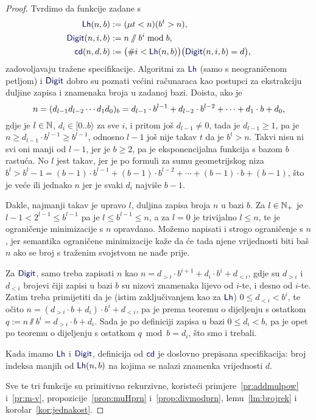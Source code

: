 \begin{proof}
Tvrdimo da funkcije zadane s
\begin{align}
    \f{Lh}(n,b)&:=(\mu t< n)(b^t>n)\text,\\
    \f{Digit}(n,i,b)&:=n\sslash b^i\bmod b\text,\\
    \f{cd}(n,d,b)&:=\bigl(\#i<\f{Lh}(n,b)\bigr)\bigl(\f{Digit}(n,i,b)=d\bigr)\text,
\end{align}
zadovoljavaju tražene specifikacije. Algoritmi za $\f{Lh}$ (samo s neograničenom petljom) i $\f{Digit}$ dobro su poznati većini računaraca kao postupci za ekstrakciju duljine zapisa i znamenaka broja u zadanoj bazi. Doista, ako je 
\begin{equation}
n=(d_{l-1}d_{l-2}\dotsm d_1d_0)_b=d_{l-1}\cdot b^{l-1}+d_{l-2}\cdot b^{l-2}+\dotsb+d_1\cdot b+d_0\text,
\end{equation}
gdje je $l\in{\mathbb N}$, $d_i\in[0..b\rangle$ za sve $i$, i pritom još $d_{l-1}\not=0$, tada je $d_{l-1}\ge1$, pa je $n\ge d_{l-1}\cdot b^{l-1}\ge b^{l-1}$, odnosno $l-1$ još nije takav $t$ da je $b^t>n$. Takvi nisu ni svi oni manji od $l-1$, jer je $b\ge 2$, pa je eksponencijalna funkcija s bazom $b$ rastuća. No $l$ jest takav, jer je po formuli za sumu geometrijskog niza $b^l>b^l-1=(b-1)\cdot b^{l-1}+(b-1)\cdot b^{l-2}+\dotsb+(b-1)\cdot b+(b-1)$, što je veće ili jednako $n$ jer je svaki $d_i$ najviše $b-1$.

Dakle, najmanji takav je upravo $l$, duljina zapisa broja $n$ u bazi $b$. Za $l\in{\mathbb N}_+$ je $l-1<2^{l-1}\le b^{l-1}$ pa je $l\le b^{l-1}\le n$, a za $l=0$ je trivijalno $l\le n$, te je ograničenje minimizacije s $n$ opravdano. Možemo napisati i strogo ograničenje s $n$, jer semantika ograničene minimizacije kaže da će tada njene vrijednosti biti baš $n$ ako se broj s traženim svojstvom ne nađe prije.

Za $\f{Digit}$, samo treba zapisati $n$ kao $n=d_{>i}\cdot b^{i+1}+d_i\cdot b^i+d_{<i}$, gdje su $d_{>i}$ i $d_{<i}$ brojevi čiji zapisi u bazi $b$ su nizovi znamenaka lijevo od $i$-te, i desno od $i$-te. Zatim treba primijetiti da je (istim zaključivanjem kao za $\f{Lh}$) $0\le d_{<i}<b^i$, te očito $n=(d_{>i}\cdot b+d_i)\cdot b^i+d_{<i}$, pa je prema teoremu o dijeljenju s ostatkom $q:=n\sslash b^i=d_{>i}\cdot b+d_i$. Sada je po definiciji zapisa u bazi $0\le d_i<b$, pa je opet po teoremu o dijeljenju s ostatkom $q\bmod b=d_i$, što smo i trebali.

Kada imamo $\f{Lh}$ i $\f{Digit}$, definicija od $\f{cd}$ je doslovno prepisana specifikacija: broj indeksa manjih od $\f{Lh}(n,b)$ na kojima se nalazi znamenka vrijednosti $d$.

Sve te tri funkcije su primitivno rekurzivne, koristeći primjere~\ref{pr:addmulpow} i~\ref{pr:m-v}, propozicije~\ref{prop:muHprn} i~\ref{prop:divmodprn}, lemu~\ref{lm:brojrek} i korolar~\ref{kor:jednakost}.
\end{proof}

